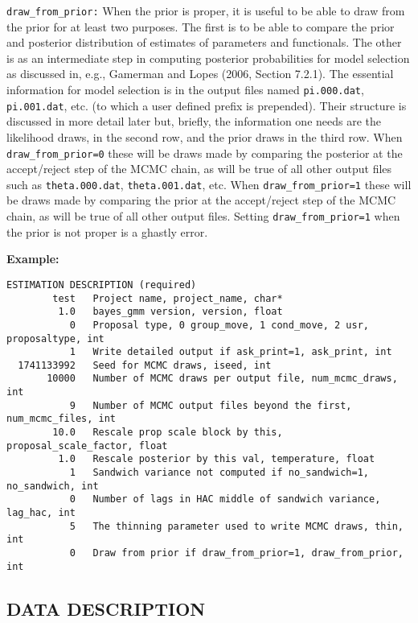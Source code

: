\documentclass[11pt, letterpaper, notitlepage]{article}
\begin{document}
\texttt{draw\_from\_prior:} When the prior is proper, it is useful to be able to draw from the prior for at least two purposes. The first is to be able to compare the prior and posterior distribution of estimates of parameters and functionals. The other is as an intermediate step in computing posterior probabilities for model selection as discussed in, e.g., Gamerman and Lopes (2006, Section 7.2.1). The essential information for model selection is in the output files named \texttt{pi.000.dat}, \texttt{pi.001.dat}, etc. (to which a user defined prefix is prepended). Their structure is discussed in more detail later but, briefly, the information one needs are the likelihood draws, in the second row, and the prior draws in the third row. When \texttt{draw\_from\_prior=0} these will be draws made by comparing the posterior at the accept/reject step of the MCMC chain, as will be true of all other output files such as \texttt{theta.000.dat}, \texttt{theta.001.dat}, etc. When \texttt{draw\_from\_prior=1} these will be draws made by comparing the prior at the accept/reject step of the MCMC chain, as will be true of all other output files. Setting \texttt{draw\_from\_prior=1} when the prior is not proper is a ghastly error.


\textbf{Example:}

\begin{verbatim}
ESTIMATION DESCRIPTION (required)
        test   Project name, project_name, char*
         1.0   bayes_gmm version, version, float
           0   Proposal type, 0 group_move, 1 cond_move, 2 usr, proposaltype, int
           1   Write detailed output if ask_print=1, ask_print, int
  1741133992   Seed for MCMC draws, iseed, int
       10000   Number of MCMC draws per output file, num_mcmc_draws, int
           9   Number of MCMC output files beyond the first, num_mcmc_files, int
        10.0   Rescale prop scale block by this, proposal_scale_factor, float
         1.0   Rescale posterior by this val, temperature, float
           1   Sandwich variance not computed if no_sandwich=1, no_sandwich, int
           0   Number of lags in HAC middle of sandwich variance, lag_hac, int
           5   The thinning parameter used to write MCMC draws, thin, int
           0   Draw from prior if draw_from_prior=1, draw_from_prior, int
\end{verbatim}

\subsection{DATA DESCRIPTION}
\end{document}
